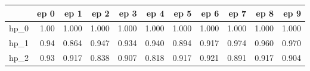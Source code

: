 \begin{tabular}{lrrrrrrrrrr}
\toprule
{} &  ep 0 &   ep 1 &   ep 2 &   ep 3 &   ep 4 &   ep 5 &   ep 6 &   ep 7 &   ep 8 &   ep 9 \\
\midrule
hp\_0 &  1.00 &  1.000 &  1.000 &  1.000 &  1.000 &  1.000 &  1.000 &  1.000 &  1.000 &  1.000 \\
hp\_1 &  0.94 &  0.864 &  0.947 &  0.934 &  0.940 &  0.894 &  0.917 &  0.974 &  0.960 &  0.970 \\
hp\_2 &  0.93 &  0.917 &  0.838 &  0.907 &  0.818 &  0.917 &  0.921 &  0.891 &  0.917 &  0.904 \\
\bottomrule
\end{tabular}
